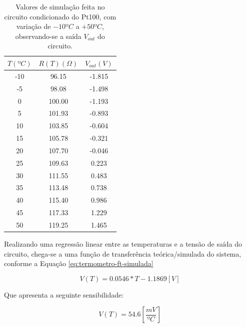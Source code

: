 \documentclass[a4paper]{instrumentacao}
\begin{document}
\begin{table}[H]
\centering
\caption{Valores de simulação feita no circuito condicionado do Pt100, com variação de $-10ºC$ a $+50ºC$, observando-se a saída $V_{out}$ do circuito.}
\label{tab:pt100-simulacao-ckt-condicionador}
\begin{tabular}{|c|c|c|}
\hline
\textbf{$T (ºC)$} & \textbf{$R(T)(\Omega)$} & \textbf{$V_{out} (V)$} \\ \hline
-10             & 96.15         & -1.815              \\ \hline
-5              & 98.08         & -1.498              \\ \hline
0               & 100.00        & -1.193              \\ \hline
5               & 101.93        & -0.893              \\ \hline
10              & 103.85        & -0.604              \\ \hline
15              & 105.78        & -0.321              \\ \hline
20              & 107.70        & -0.046              \\ \hline
25              & 109.63        & 0.223               \\ \hline
30              & 111.55        & 0.483               \\ \hline
35              & 113.48        & 0.738               \\ \hline
40              & 115.40        & 0.986               \\ \hline
45              & 117.33        & 1.229               \\ \hline
50              & 119.25        & 1.465               \\ \hline
\end{tabular}
\end{table}

Realizando uma regressão linear entre as temperaturas e a tensão de saída do circuito, chega-se a uma função de transferência teórica/simulada do sistema, conforme a Equação \ref{eq:termometro-ft-simulada}

\begin{equation}
	V(T)=0.0546*T-1.1869 [V]
	\label{eq:termometro-ft-simulada}
\end{equation}

Que apresenta a seguinte sensibilidade:

\begin{equation}
	V(T)=54.6 [\frac{mV}{ºC}]
	\label{eq:termometro-sensibilidade-ft-simulada}
\end{equation}
\end{document}
